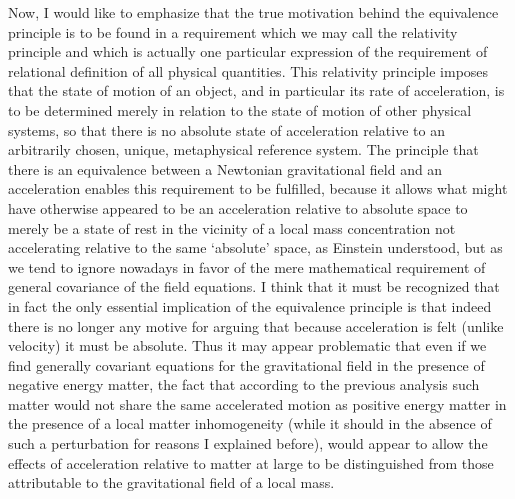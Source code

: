 \documentclass[notitlepage,12pt]{report}
\begin{document}
Now, I would like to emphasize that the true motivation behind the equivalence principle is to be found in a requirement which we may call the relativity principle and which is actually one particular expression of the requirement of relational definition of all physical quantities. This relativity principle imposes that the state of motion of an object, and in particular its rate of acceleration, is to be determined merely in relation to the state of motion of other physical systems, so that there is no absolute state of acceleration relative to an arbitrarily chosen, unique, metaphysical reference system. The principle that there is an equivalence between a Newtonian gravitational field and an acceleration enables this requirement to be fulfilled, because it allows what might have otherwise appeared to be an acceleration relative to absolute space to merely be a state of rest in the vicinity of a local mass concentration not accelerating relative to the same `absolute' space, as Einstein understood, but as we tend to ignore nowadays in favor of the mere mathematical requirement of general covariance of the field equations. I think that it must be recognized that in fact the only essential implication of the equivalence principle is that indeed there is no longer any motive for arguing that because acceleration is felt (unlike velocity) it must be absolute. Thus it may appear problematic that even if we find generally covariant equations for the gravitational field in the presence of negative energy matter, the fact that according to the previous analysis such matter would not share the same accelerated motion as positive energy matter in the presence of a local matter inhomogeneity (while it should in the absence of such a perturbation for reasons I explained before), would appear to allow the effects of acceleration relative to matter at large to be distinguished from those attributable to the gravitational field of a local mass.
\end{document}
